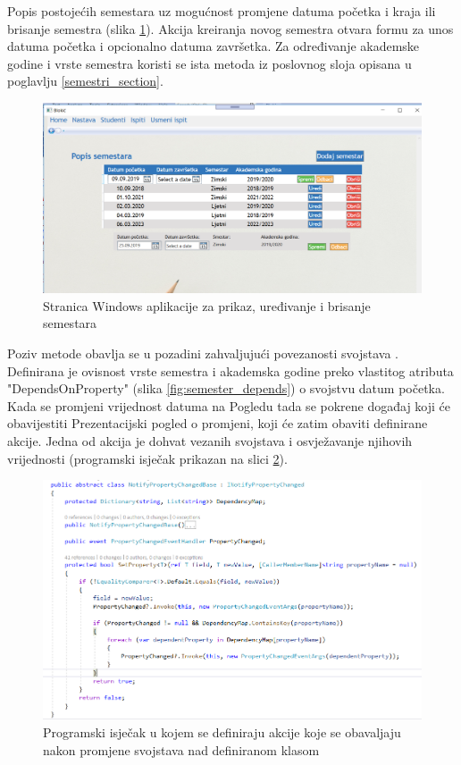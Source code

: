 \documentclass[times, utf8, diplomski]{fer}
\begin{document}
Popis postojećih semestara uz mogućnost promjene datuma početka i kraja ili brisanje semestra (slika \ref{fig:semesters}). Akcija kreiranja novog semestra otvara formu za unos datuma početka i opcionalno datuma završetka. Za određivanje akademske godine i vrste semestra koristi se ista metoda iz poslovnog sloja opisana u poglavlju \ref{semestri_section}.

\begin{figure}[htb]
\centering
\includegraphics[width=12cm]{semesters.PNG}
\caption{Stranica Windows aplikacije za prikaz, uređivanje i brisanje semestara}
\label{fig:semesters}
\end{figure}

Poziv metode obavlja se u pozadini zahvaljujući povezanosti svojstava . Definirana je ovisnost vrste semestra i akademska godine preko vlastitog atributa "DependsOnProperty" (slika \ref{fig:semester_depends}) o svojstvu datum početka. Kada se promjeni vrijednost datuma na Pogledu tada se pokrene događaj koji će obavijestiti Prezentacijski pogled o promjeni, koji će zatim obaviti definirane akcije. Jedna od akcija je dohvat vezanih svojstava i osvježavanje njihovih vrijednosti (programski isječak prikazan na slici \ref{fig:notifychange}).

\begin{figure}[htb]
\centering
\includegraphics[width=14cm]{notifypropertychangebase.PNG}
\caption{Programski isječak u kojem se definiraju akcije koje se obavaljaju nakon promjene svojstava nad definiranom klasom}
\label{fig:notifychange}
\end{figure}
\end{document}

